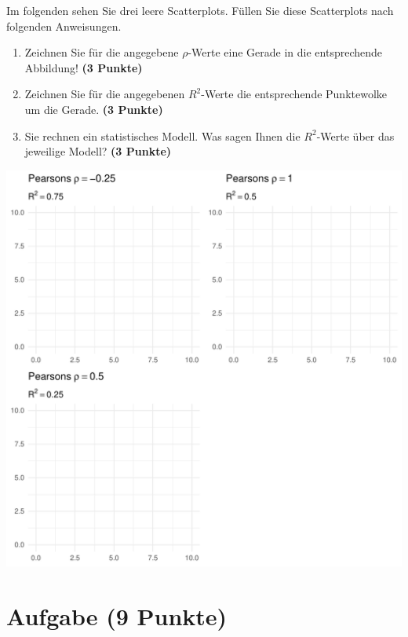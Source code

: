 \documentclass[a4paper, 10pt]{scrartcl}\usepackage[]{graphicx}\usepackage[]{xcolor}
\makeatletter
\def\maxwidth{ %
  \ifdim\Gin@nat@width>\linewidth
    \linewidth
  \else
    \Gin@nat@width
  \fi
}
\makeatother
\begin{document}
Im folgenden sehen Sie drei leere Scatterplots. F{\"u}llen Sie diese
Scatterplots nach folgenden Anweisungen.

\begin{enumerate}
\item Zeichnen Sie f{\"u}r die angegebene $\rho$-Werte eine Gerade in die
  entsprechende Abbildung! \textbf{(3 Punkte)}
\item Zeichnen Sie f{\"u}r die angegebenen $R^2$-Werte die entsprechende
  Punktewolke um die Gerade. \textbf{(3 Punkte)}
\item Sie rechnen ein statistisches Modell. Was sagen Ihnen die $R^2$-Werte
  {\"u}ber das jeweilige Modell? \textbf{(3 Punkte)}
\end{enumerate}




{\centering \includegraphics[width=\maxwidth]{img/correlation-01-1} 

}



 
\clearpage

\section{Aufgabe \hfill (9 Punkte)}
\end{document}
